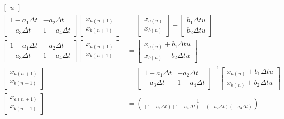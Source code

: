 \documentclass[11pt]{article}
\begin{document}
\begin{subequations}
\begin{align}
\begin{bmatrix}
      u
    \end{bmatrix} \\
    \begin{bmatrix}
      1 - a_1\Delta t & - a_2\Delta t \\
      - a_3\Delta t & 1 - a_4\Delta t
    \end{bmatrix}
    \begin{bmatrix}
      x_{a(n+1)} \\
      x_{b(n+1)}
    \end{bmatrix} &=
    \begin{bmatrix}
      x_{a(n)} \\
      x_{b(n)}
    \end{bmatrix} +
    \begin{bmatrix}
      b_1\Delta t u \\
      b_2\Delta t u
    \end{bmatrix} \\
    \begin{bmatrix}
      1 - a_1\Delta t & - a_2\Delta t \\
      - a_3\Delta t & 1 - a_4\Delta t
    \end{bmatrix}
    \begin{bmatrix}
      x_{a(n+1)} \\
      x_{b(n+1)}
    \end{bmatrix} &=
    \begin{bmatrix}
      x_{a(n)} + b_1\Delta t u \\
      x_{b(n)} + b_2\Delta t u
    \end{bmatrix} \\
    \begin{bmatrix}
      x_{a(n+1)} \\
      x_{b(n+1)}
    \end{bmatrix} &=
    \begin{bmatrix}
      1 - a_1\Delta t & - a_2\Delta t \\
      - a_3\Delta t & 1 - a_4\Delta t
    \end{bmatrix} ^{-1}
    \begin{bmatrix}
      x_{a(n)} + b_1\Delta t u \\
      x_{b(n)} + b_2\Delta t u
    \end{bmatrix} \\
    \begin{bmatrix}
      x_{a(n+1)} \\
      x_{b(n+1)}
    \end{bmatrix} &=
    \left(\frac{1}{(1 - a_1\Delta t)(1 - a_4\Delta t) -(- a_2\Delta t)(- a_3\Delta t)}\right) \\ \nonumber

\end{align}
\end{subequations}
\end{document}
